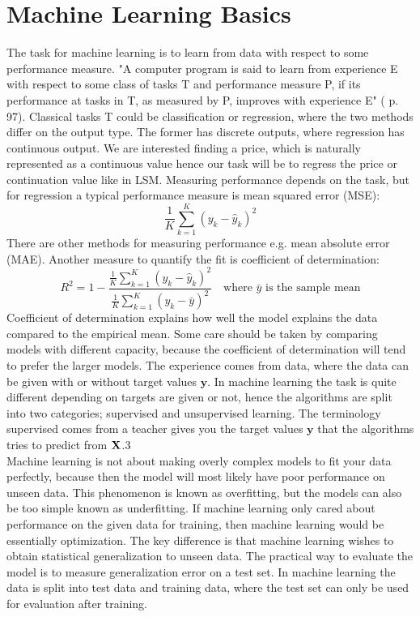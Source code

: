 \section{Machine Learning Basics}
The task for machine learning is to learn from data with respect to some performance measure. "A computer program is said to learn from experience E with respect to some class of tasks T and performance measure P, if its performance at tasks in T, as measured by P, improves with experience E" (\parencite{Goodfellow-et-al-2016} p. 97). Classical tasks T could be classification or regression, where the two methods differ on the output type. The former has discrete outputs, where regression has continuous output. We are interested finding a price, which is naturally represented as a continuous value hence our task will be to regress the price or continuation value like in LSM. Measuring performance depends on the task, but for regression a typical performance measure is mean squared error (MSE):
$$\frac{1}{K}\sum_{k=1}^{K} (y_k-\hat{y}_k)^2$$
There are other methods for measuring performance e.g. mean absolute error (MAE). Another measure to quantify the fit is coefficient of determination:
$$R^2=1-\frac{\frac{1}{K}\sum_{k=1}^{K} (y_k-\hat{y}_k)^2}{\frac{1}{K}\sum_{k=1}^{K} (y_k-\bar{y})^2} \quad \text{where $\bar{y}$ is the sample mean}$$
Coefficient of determination explains how well the model explains the data compared to the empirical mean. Some care should be taken by comparing models with different capacity, because the coefficient of determination will tend to prefer the larger models. The experience comes from data, where the data can be given with or without target values $\bm{y}$. In machine learning the task is quite different depending on targets are given or not, hence the algorithms are split into two categories; supervised and unsupervised learning. The terminology supervised comes from a teacher gives you the target values $\bm{y}$ that the algorithms tries to predict from $\mathbf{X}$.3\\

Machine learning is not about making overly complex models to fit your data perfectly, because then the model will most likely have poor performance on unseen data. This phenomenon is known as overfitting, but the models can also be too simple known as underfitting. If machine learning only cared about performance on the given data for training, then machine learning would be essentially optimization. The key difference is that machine learning wishes to obtain statistical generalization to unseen data. The practical way to evaluate the model is to measure generalization error on a test set. In machine learning the data is split into test data and training data, where the test set can only be used for evaluation after training. \\

